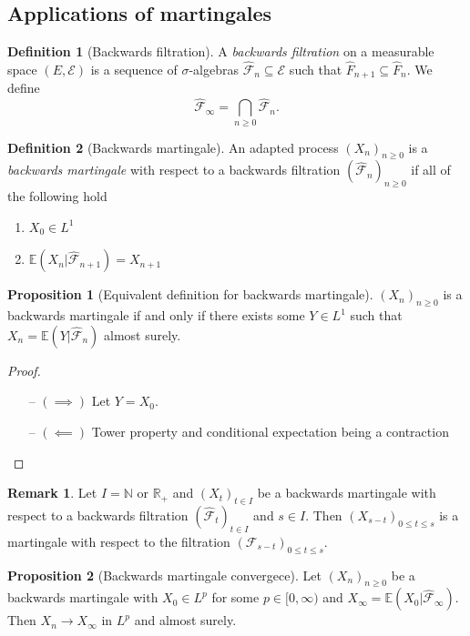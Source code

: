 \documentclass[parskip=full]{article}
\theoremstyle{definition}
\newtheorem*{definition}{Definition}
\newtheorem{proposition}{Proposition}[section]
\newtheorem*{remark}{Remark}
\newcommand{\R}{\mathbb{R}}
\newcommand{\N}{\mathbb{N}}
\newcommand{\1}{\mathbbm{1}}
\newcommand{\E}{\mathbb{E}}
\begin{document}
\subsection{Applications of martingales}
\begin{definition}[Backwards filtration]
  A \emph{backwards filtration} on a measurable space $(E, \mathcal{E})$ is a sequence of $\sigma$-algebras $\hat{\mathcal{F}}_n \subseteq \mathcal{E}$ such that $\hat{F}_{n + 1} \subseteq \hat{F}_n$. We define
  \[
    \hat{\mathcal{F}}_\infty = \bigcap_{n \geq 0} \hat{\mathcal{F}}_n.
  \]
\end{definition}

\begin{definition}[Backwards martingale]
  An adapted process $(X_n)_{n \geq 0}$ is a \emph{backwards martingale} with respect to a backwards filtration $(\hat{\mathcal{F}}_n)_{n \geq 0}$ if all of the following hold
  \begin{enumerate}
    \item $X_0 \in L^1$
    \item $\E(X_n | \hat{\mathcal{F}}_{n + 1}) = X_{n + 1}$
  \end{enumerate}
\end{definition}

\begin{proposition}[Equivalent definition for backwards martingale]
  $(X_n)_{n \geq 0}$ is a backwards martingale if and only if there exists some $Y \in L^1$ such that $X_n = \E(Y | \hat{\mathcal{F}}_n)$ almost surely.
\end{proposition}

\begin{proof}
  \begin{itemize}
    \item [--] $(\implies)$ Let $Y = X_0$.
    \item [--] $(\impliedby)$ Tower property and conditional expectation being a contraction
  \end{itemize}
\end{proof}

\begin{remark}
  Let $I=\N$ or $\R_+$ and $(X_t)_{t \in I}$ be a backwards martingale with respect to a backwards filtration $(\hat{\mathcal{F}}_t)_{t \in I}$ and $s \in I$. Then $(X_{s - t})_{0 \leq t \leq s}$ is a martingale with respect to the filtration $(\mathcal{F}_{s - t})_{0 \leq t \leq s}$. 
\end{remark}

\begin{proposition}[Backwards martingale convergece] \label{Backwards martingale convergence}
  Let $(X_n)_{n \geq 0}$ be a backwards martingale with $X_0 \in L^p$ for some $p \in [0, \infty)$ and $X_\infty = \E(X_0 | \hat{\mathcal{F}}_\infty)$. Then $X_n \to X_\infty$ in $L^p$ and almost surely.
\end{proposition}
\end{document}
